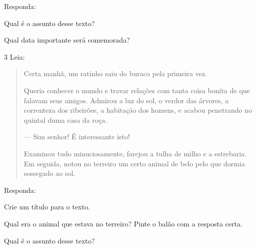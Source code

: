 
Responda:

\begin{escolha}
\item Qual é o assunto desse texto?


\item Qual data importante será comemorada?

\end{escolha}

\num{3} Leia:


\begin{quote}
Certa manhã, um ratinho saiu do buraco pela primeira vez.

Queria conhecer o mundo e travar relações com tanta coisa bonita de que
falavam seus amigos. Admirou a luz do sol, o verdor das árvores, a
correnteza dos ribeirões, a habitação dos homens, e acabou penetrando no
quintal duma casa da roça.

--- Sim senhor! É interessante isto!

Examinou tudo minuciosamente, farejou a tulha de milho e a estrebaria.
Em seguida, notou no terreiro um certo animal de belo pelo que dormia
sossegado ao sol.
\end{quote}


Responda:

\begin{escolha}
\item Crie um título para o texto.


\item Qual era o animal que estava no terreiro? Pinte o balão com a resposta certa.

\item Qual é o assunto desse texto?

\end{escolha}

